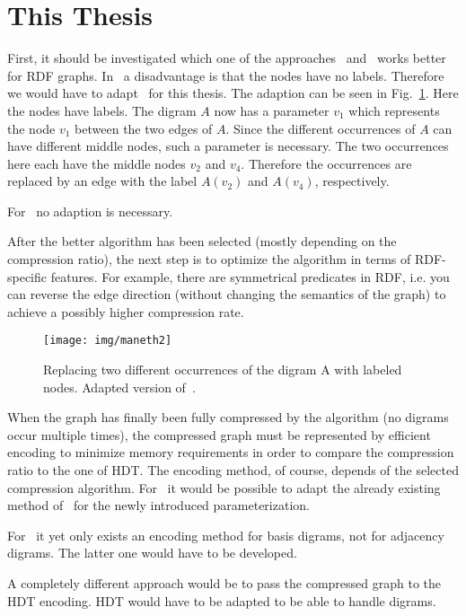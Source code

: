 \documentclass[a4paper]{scrartcl}
\begin{document}
\section{This Thesis}

First, it should be investigated which one of the approaches~\cite{maneth} and~\cite{mattdk} works better for RDF graphs.
In~\cite{maneth} a disadvantage is that the nodes have no labels. Therefore we would have to adapt~\cite{maneth} for this thesis. The adaption can be seen in Fig.~\ref{fig:maneth2}. Here the nodes have labels. The digram $A$ now has a parameter $v_1$ which represents the node $v_1$ between the two edges of $A$. Since the different occurrences of $A$ can have different middle nodes, such a parameter is necessary. The two occurrences here each have the middle nodes $v_2$ and $v_4$. Therefore the occurrences are replaced by an edge with the label $A(v_2)$ and $A(v_4)$, respectively.

For~\cite{mattdk} no adaption is necessary.

After the better algorithm has been selected (mostly depending on the compression ratio), the next step is to optimize the algorithm in terms of RDF-specific features. For example, there are symmetrical predicates in RDF, i.e. you can reverse the edge direction (without changing the semantics of the graph) to achieve a possibly higher compression rate.



\begin{figure}[h]
	\centering
	\texttt{[image: img/maneth2]}
	\caption{Replacing two different occurrences of the digram A with labeled nodes. Adapted version of~\cite{maneth}.}
	\label{fig:maneth2}
\end{figure}


When the graph has finally been fully compressed by the algorithm (no digrams occur multiple times), the compressed graph must be represented by efficient encoding to minimize memory requirements in order to compare the compression ratio to the one of HDT. The encoding method, of course, depends of the selected compression algorithm. For~\cite{maneth} it would be possible to adapt the already existing method of~\cite{maneth} for the newly introduced parameterization.

For~\cite{mattdk} it yet only exists an encoding method for basis digrams, not for adjacency digrams. The latter one would have to be developed.

A completely different approach would be to pass the compressed graph to the HDT encoding. HDT would have to be adapted to be able to handle digrams. 
\end{document}
